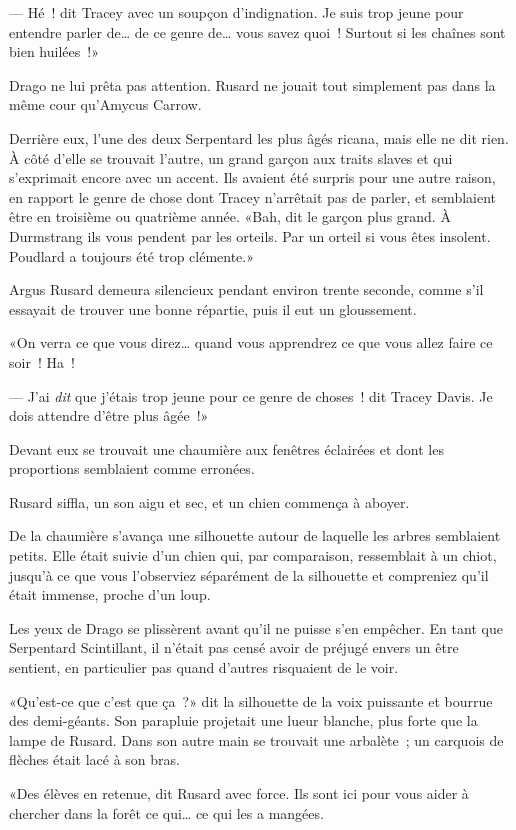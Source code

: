 --- Hé~! dit Tracey avec un soupçon d'indignation. Je suis trop jeune pour entendre parler de… de ce genre de… vous savez quoi~! Surtout si les chaînes sont bien huilées~!»

Drago ne lui prêta pas attention. Rusard ne jouait tout simplement pas dans la même cour qu'Amycus Carrow.

Derrière eux, l'une des deux Serpentard les plus âgés ricana, mais elle ne dit rien. À côté d'elle se trouvait l'autre, un grand garçon aux traits slaves et qui s'exprimait encore avec un accent. Ils avaient été surpris pour une autre raison, en rapport le genre de chose dont Tracey n'arrêtait pas de parler, et semblaient être en troisième ou quatrième année. «Bah, dit le garçon plus grand. À Durmstrang ils vous pendent par les orteils. Par un orteil si vous êtes insolent. Poudlard a toujours été trop clémente.»

Argus Rusard demeura silencieux pendant environ trente seconde, comme s'il essayait de trouver une bonne répartie, puis il eut un gloussement.

«On verra ce que vous direz… quand vous apprendrez ce que vous allez faire ce soir~! Ha~!

--- J'ai \emph{dit} que j'étais trop jeune pour ce genre de choses~! dit Tracey Davis. Je dois attendre d'être plus âgée~!»

Devant eux se trouvait une chaumière aux fenêtres éclairées et dont les proportions semblaient comme erronées.

Rusard siffla, un son aigu et sec, et un chien commença à aboyer.

De la chaumière s'avança une silhouette autour de laquelle les arbres semblaient petits. Elle était suivie d'un chien qui, par comparaison, ressemblait à un chiot, jusqu'à ce que vous l'observiez séparément de la silhouette et compreniez qu'il était immense, proche d'un loup.

Les yeux de Drago se plissèrent avant qu'il ne puisse s'en empêcher. En tant que Serpentard Scintillant, il n'était pas censé avoir de préjugé envers un être sentient, en particulier pas quand d'autres risquaient de le voir.

«Qu'est-ce que c'est que ça~?» dit la silhouette de la voix puissante et bourrue des demi-géants. Son parapluie projetait une lueur blanche, plus forte que la lampe de Rusard. Dans son autre main se trouvait une arbalète~; un carquois de flèches était lacé à son bras.

«Des élèves en retenue, dit Rusard avec force. Ils sont ici pour vous aider à chercher dans la forêt ce qui… ce qui les a mangées.

